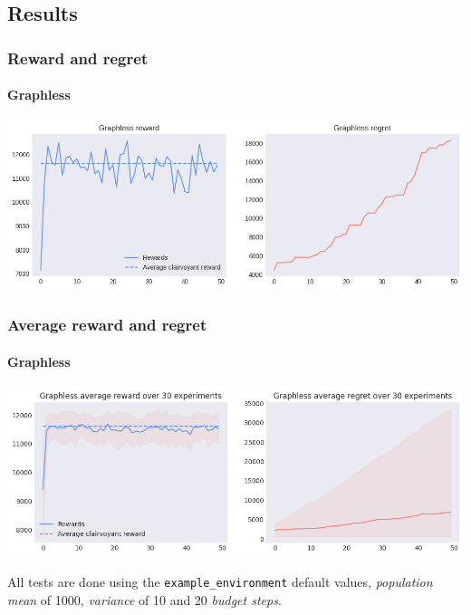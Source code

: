
\subsection{Results}


\begin{frame}[plain]

\frametitle{Reward and regret}
\framesubtitle{Graphless}

\begin{center}
	\includegraphics[scale=0.4]{img/Graphs/graphless/image1.png}
\end{center}

\end{frame}


\begin{frame}[plain]

\frametitle{Average reward and regret}
\framesubtitle{Graphless}

\begin{center}
	\includegraphics[scale=0.4]{img/Graphs/graphless/image2.png}
\end{center}

\vspace*{2em}

\scriptsize All tests are done using the \texttt{example\_environment} default values, \textit{population mean} of 1000, \textit{variance} of 10 and 20 \textit{budget steps}.

\end{frame}

